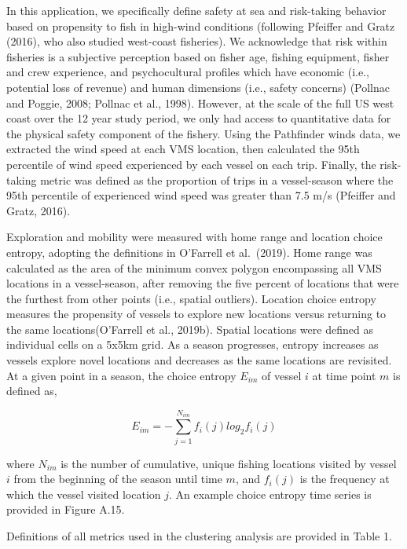 \documentclass[]{elsarticle} %
\begin{document}
In this application, we specifically define safety at sea and
risk-taking behavior based on propensity to fish in high-wind conditions
(following Pfeiffer and Gratz (2016), who also studied west-coast
fisheries). We acknowledge that risk within fisheries is a subjective
perception based on fisher age, fishing equipment, fisher and crew
experience, and psychocultural profiles which have economic (i.e.,
potential loss of revenue) and human dimensions (i.e., safety concerns)
(Pollnac and Poggie, 2008; Pollnac et al., 1998). However, at the scale
of the full US west coast over the 12 year study period, we only had
access to quantitative data for the physical safety component of the
fishery. Using the Pathfinder winds data, we extracted the wind speed at
each VMS location, then calculated the 95th percentile of wind speed
experienced by each vessel on each trip. Finally, the risk-taking metric
was defined as the proportion of trips in a vessel-season where the 95th
percentile of experienced wind speed was greater than 7.5 m/s (Pfeiffer
and Gratz, 2016).

Exploration and mobility were measured with home range and location
choice entropy, adopting the definitions in O'Farrell et al.~(2019).
Home range was calculated as the area of the minimum convex polygon
encompassing all VMS locations in a vessel-season, after removing the
five percent of locations that were the furthest from other points
(i.e., spatial outliers). Location choice entropy measures the
propensity of vessels to explore new locations versus returning to the
same locations(O'Farrell et al., 2019b). Spatial locations were defined
as individual cells on a 5x5km grid. As a season progresses, entropy
increases as vessels explore novel locations and decreases as the same
locations are revisited. At a given point in a season, the choice
entropy \(E_{im}\) of vessel \(i\) at time point \(m\) is defined as,

\begin{equation}
  E_{im} = -\sum_{j=1}^{N_{im}}f_i(j)log_2f_i(j)
\end{equation}

where \(N_{im}\) is the number of cumulative, unique fishing locations
visited by vessel \(i\) from the beginning of the season until time
\(m\), and \(f_i(j)\) is the frequency at which the vessel visited
location \(j\). An example choice entropy time series is provided in
Figure A.15.

Definitions of all metrics used in the clustering analysis are provided
in Table 1.
\end{document}
